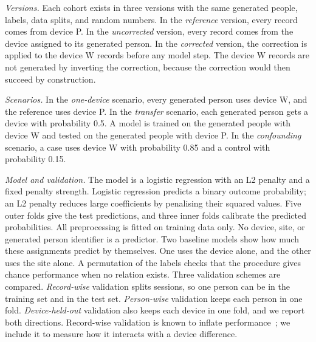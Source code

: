 \emph{Versions.}
Each cohort exists in three versions with the same generated people, labels, data splits, and random numbers.
In the \emph{reference} version, every record comes from device P.
In the \emph{uncorrected} version, every record comes from the device assigned to its generated person.
In the \emph{corrected} version, the correction is applied to the device W records before any model step.
The device W records are not generated by inverting the correction, because the correction would then succeed by construction.

\emph{Scenarios.}
In the \emph{one-device} scenario, every generated person uses device W, and the reference uses device P.
In the \emph{transfer} scenario, each generated person gets a device with probability 0.5.
A model is trained on the generated people with device W and tested on the generated people with device P.
In the \emph{confounding} scenario, a case uses device W with probability 0.85 and a control with probability 0.15.

\emph{Model and validation.}
The model is a logistic regression with an L2 penalty and a fixed penalty strength.
Logistic regression predicts a binary outcome probability; an L2 penalty reduces large coefficients by penalising their squared values.
Five outer folds give the test predictions, and three inner folds calibrate the predicted probabilities.
All preprocessing is fitted on training data only.
No device, site, or generated person identifier is a predictor.
Two baseline models show how much these assignments predict by themselves.
One uses the device alone, and the other uses the site alone.
A permutation of the labels checks that the procedure gives chance performance when no relation exists.
Three validation schemes are compared.
\emph{Record-wise} validation splits sessions, so one person can be in the training set and in the test set.
\emph{Person-wise} validation keeps each person in one fold.
\emph{Device-held-out} validation also keeps each device in one fold, and we report both directions.
Record-wise validation is known to inflate performance~\cite{Saeb2017}; we include it to measure how it interacts with a device difference.

